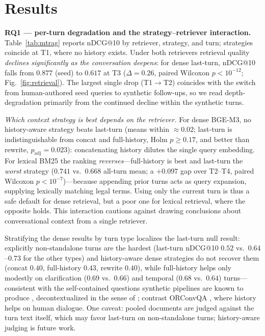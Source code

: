 \documentclass[conference]{IEEEtran}
\begin{document}
\section{Results}
\label{sec:results}
\textbf{RQ1 --- per-turn degradation and the strategy--retriever interaction.}
Table~\ref{tab:mtrag} reports nDCG@10 by retriever, strategy, and turn; strategies
coincide at T1, where no history exists. Under both retrievers retrieval quality
\emph{declines significantly as the conversation deepens}: for dense last-turn,
nDCG@10 falls from $0.877$ (seed) to $0.617$ at T3 ($\Delta{=}0.26$, paired Wilcoxon
$p<10^{-12}$; Fig.~\ref{fig:retrieval}). The largest single drop (T1$\to$T2)
coincides with the switch from human-authored seed queries to synthetic follow-ups,
so we read depth-degradation primarily from the continued decline within the
synthetic turns.

\emph{Which context strategy is best depends on the retriever.} For dense BGE-M3, no
history-aware strategy beats last-turn (means within $\approx$0.02; last-turn is
indistinguishable from concat and full-history, Holm $p\ge0.17$, and better than
rewrite, $p_{\text{adj}}{=}0.023$): concatenating history dilutes the single query
embedding. For lexical BM25 the ranking \emph{reverses}---full-history is best and
last-turn the \emph{worst} strategy ($0.741$ vs.\ $0.668$ all-turn mean; a $+0.097$
gap over T2--T4, paired Wilcoxon $p<10^{-7}$)---because appending prior turns acts as
query expansion, supplying lexically matching legal terms. Using only the current
turn is thus a safe default for dense retrieval, but a poor one for lexical
retrieval, where the opposite holds. This interaction cautions against drawing
conclusions about conversational context from a single retriever.

Stratifying the dense results by turn type localizes the last-turn null result:
explicitly non-standalone turns are the hardest (last-turn nDCG@10 $0.52$ vs.\
$0.64$--$0.73$ for the other types) and history-aware dense strategies do not
recover them (concat $0.40$, full-history $0.43$, rewrite $0.40$), while
full-history helps only modestly on clarification ($0.69$ vs.\ $0.66$) and temporal
($0.68$ vs.\ $0.64$) turns---consistent with the self-contained questions synthetic
pipelines are known to produce \cite{Vlachos2025Synthetic}, decontextualized in the
sense of \cite{Choi2021Decontextualization}; contrast ORConvQA
\cite{Qu2020ORConvQA}, where history helps on human dialogue. One caveat: pooled
documents are judged against the turn text itself, which may favor last-turn on
non-standalone turns; history-aware judging is future work.
\end{document}
